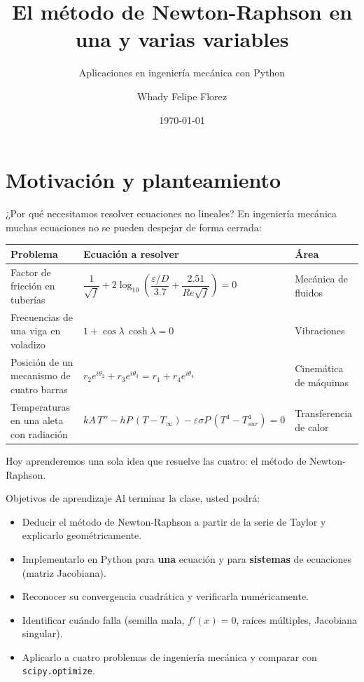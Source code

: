 \documentclass[aspectratio=169,11pt]{beamer}
\title[Newton-Raphson]{El método de Newton-Raphson en una y varias variables}
\subtitle{Aplicaciones en ingeniería mecánica con Python}
\author{Whady Felipe Florez}
\institute[Métodos Numéricos]{Métodos Numéricos --- Ingeniería Mecánica (tercer semestre)}
\date{\today}
\begin{document}
\begin{frame}
  \titlepage
\end{frame}

\section{Motivación y planteamiento}

\begin{frame}{¿Por qué necesitamos resolver ecuaciones no lineales?}
  En ingeniería mecánica muchas ecuaciones \alert{no se pueden despejar} de forma cerrada:
  \medskip
  \begin{center}
  \footnotesize
  \begin{tabular}{@{}>{\raggedright\arraybackslash}p{}>{\centering\arraybackslash}p{}>{\raggedright\arraybackslash}p{}@{}}
    \toprule
    \textbf{Problema} & \textbf{Ecuación a resolver} & \textbf{Área} \\
    \midrule
    Factor de fricción en tuberías & $\dfrac{1}{\sqrt f}+2\log_{10}\!\left(\dfrac{\varepsilon/D}{3.7}+\dfrac{2.51}{Re\sqrt f}\right)=0$ & Mecánica de fluidos \\[2.5ex]
    Frecuencias de una viga en voladizo & $1+\cos\lambda\,\cosh\lambda=0$ & Vibraciones \\[1.5ex]
    Posición de un mecanismo de cuatro barras & $r_2e^{i\theta_2}+r_3e^{i\theta_3}=r_1+r_4e^{i\theta_4}$ & Cinemática de máquinas \\[1.5ex]
    Temperaturas en una aleta con radiación & $kA\,T''-hP\,(T-T_\infty)-\varepsilon\sigma P\,(T^4-T_{sur}^4)=0$ & Transferencia de calor \\
    \bottomrule
  \end{tabular}
  \end{center}
  \medskip
  Hoy aprenderemos \alert{una sola idea} que resuelve las cuatro: el método de Newton-Raphson.
\end{frame}

\begin{frame}{Objetivos de aprendizaje}
  Al terminar la clase, usted podrá:
  \begin{itemize}
    \item Deducir el método de Newton-Raphson a partir de la serie de Taylor y explicarlo geométricamente.
    \item Implementarlo en Python para \textbf{una} ecuación y para \textbf{sistemas} de ecuaciones (matriz Jacobiana).
    \item Reconocer su \alert{convergencia cuadrática} y verificarla numéricamente.
    \item Identificar cuándo \alert{falla} (semilla mala, $f'(x)=0$, raíces múltiples, Jacobiana singular).
    \item Aplicarlo a cuatro problemas de ingeniería mecánica y comparar con \texttt{scipy.optimize}.
  \end{itemize}
\end{frame}
\end{document}
